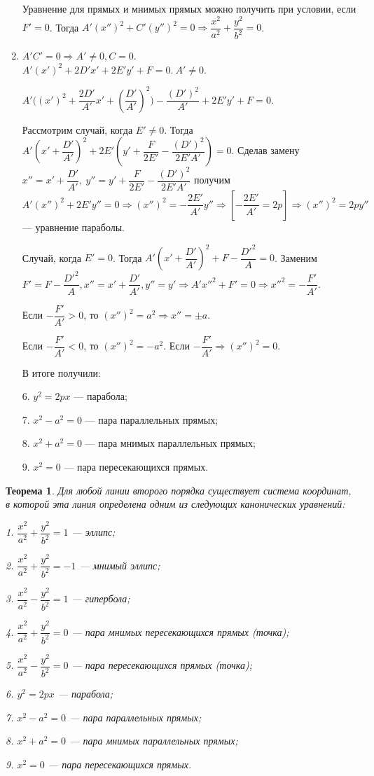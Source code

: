 \documentclass[a4paper, 12pt]{report}
\begin{document}
\begin{enumerate}
	Уравнение для прямых и мнимых прямых можно получить при условии, если $F' = 0$. Тогда $A'(x'')^2 + C'(y'')^2 = 0 \Rightarrow \dfrac{x^2}{a^2} + \dfrac{y^2}{b^2} = 0$.
	\item  $A'C' = 0 \Rightarrow A' \neq 0, C = 0$.\\
	$A'(x')^2 + 2D'x' + 2E'y' + F = 0.\ A' \neq 0$.
	
	$A'\Big((x')^2 + \dfrac{2D'}{A'}x' + (\dfrac{D'}{A'})^2\Big) - \dfrac{(D')^2}{A'} + 2E'y' + F = 0$.
	
	Рассмотрим случай, когда $E' \neq 0$. Тогда $A'(x' + \dfrac{D'}{A'})^2 + 2E'(y' + \dfrac{F}{2E'} - \dfrac{(D')^2}{2E'A'}) = 0$. Сделав замену $x'' = x' + \dfrac{D'}{A'},\ y'' = y' + \dfrac{F}{2E'} - \dfrac{(D')^2}{2E'A'}$ получим $A'(x'')^2 + 2E'y'' = 0 \Rightarrow (x'')^2 = -\dfrac{2E'}{A'}y'' \Rightarrow [-\dfrac{2E'}{A'} = 2p] \Rightarrow (x'')^2 = 2py''$ --- уравнение параболы.
	
	Случай, когда $E' = 0$. Тогда $A'(x' + \dfrac{D'}{A'})^2 + F - \dfrac{D'^2}{A} = 0$. Заменим $F' = F - \dfrac{D'^2}{A}, x'' = x' + \dfrac{D'}{A'}, y'' = y' \Rightarrow A'x''^2 + F' = 0 \Rightarrow x''^2 = -\dfrac{F'}{A'}$.
	
	Если $-\dfrac{F'}{A'} > 0$, то $(x'')^2 = a^2 \Rightarrow x'' = \pm a$.
	
	Если $-\dfrac{F'}{A'} < 0$, то $(x'')^2 = -a^2$. Если $-\dfrac{F'}{A'} \Rightarrow (x'')^2 = 0$.
	
	В итоге получили:
	
	6. $y^2 = 2px$ --- парабола;
	
	7. $x^2 - a^2 = 0$ --- пара параллельных прямых;
	
	8. $x^2 + a^2 = 0$ --- пара мнимых параллельных прямых;
	
	9. $x^2 = 0$ --- пара пересекающихся прямых.
\end{enumerate}
\newtheorem*{th20}{Теорема}\begin{th20}
	Для любой линии второго порядка существует система координат, в которой эта линия определена одним из следующих канонических уравнений:
	
	1. $\dfrac{x^2}{a^2} + \dfrac{y^2}{b^2} = 1$ --- эллипс;
	
	2. $\dfrac{x^2}{a^2} + \dfrac{y^2}{b^2} = -1$ --- мнимый эллипс;
	
	3. $\dfrac{x^2}{a^2} - \dfrac{y^2}{b^2} = 1$ --- гипербола;
	
	4. $\dfrac{x^2}{a^2} + \dfrac{y^2}{b^2} = 0$ --- пара мнимых пересекающихся прямых (точка);
	
	5. $\dfrac{x^2}{a^2} - \dfrac{y^2}{b^2} = 0$ --- пара пересекающихся прямых (точка);
	
	6. $y^2 = 2px$ --- парабола;
	
	7. $x^2 - a^2 = 0$ --- пара параллельных прямых;
	
	8. $x^2 + a^2 = 0$ --- пара мнимых параллельных прямых;
	
	9. $x^2 = 0$ --- пара пересекающихся прямых.
\end{th20}
\end{document}
